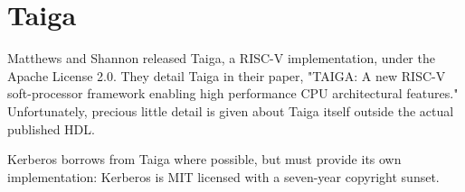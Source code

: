 \section{Taiga}

Matthews and Shannon released Taiga, a RISC-V implementation, under the Apache License 2.0.  They detail Taiga in their paper, "TAIGA: A new RISC-V soft-processor framework enabling high performance CPU architectural features."  Unfortunately, precious little detail is given about Taiga itself outside the actual published HDL.

Kerberos borrows from Taiga where possible, but must provide its own implementation:  Kerberos is MIT licensed with a seven-year copyright sunset.
